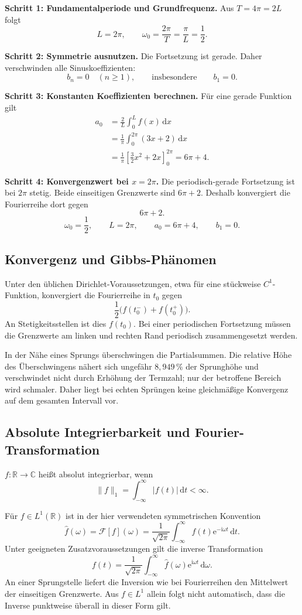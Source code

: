 \documentclass[11pt,a4paper]{article}
\newcommand{\C}{\mathbb C}
\newcommand{\R}{\mathbb R}
\newcommand{\ii}{\mathrm i}
\newcommand{\ee}{\mathrm e}
\newcommand{\dd}{\,\mathrm d}
\newcommand{\1}{\mathbf 1}
\begin{document}
{\begin{beispielbox}[title={Vorgerechnetes Prüfungsbeispiel: Aufgabe 11 (2024) -- Fourierreihe}]
\textbf{Schritt 1: Fundamentalperiode und Grundfrequenz.}
Aus $T=4\pi=2L$ folgt
\[
L=2\pi,
\qquad
\omega_0=\frac{2\pi}{T}=\frac{\pi}{L}=\frac12.
\]

\textbf{Schritt 2: Symmetrie ausnutzen.}
Die Fortsetzung ist gerade. Daher verschwinden alle Sinuskoeffizienten:
\[
b_n=0\quad(n\geq1),
\qquad\text{insbesondere}\qquad b_1=0.
\]

\textbf{Schritt 3: Konstanten Koeffizienten berechnen.}
Für eine gerade Funktion gilt
\[
\begin{aligned}
a_0
&=\frac{2}{L}\int_0^L f(x)\dd x\\
&=\frac1\pi\int_0^{2\pi}(3x+2)\dd x\\
&=\frac1\pi
\left[\frac32x^2+2x\right]_0^{2\pi}
=6\pi+4.
\end{aligned}
\]

\textbf{Schritt 4: Konvergenzwert bei $x=2\pi$.}
Die periodisch-gerade Fortsetzung ist bei $2\pi$ stetig. Beide einseitigen
Grenzwerte sind $6\pi+2$. Deshalb konvergiert die Fourierreihe dort gegen
\[
\boxed{6\pi+2}.
\]
\[
\boxed{
\omega_0=\frac12,\qquad L=2\pi,\qquad
a_0=6\pi+4,\qquad b_1=0.
}
\]
\end{beispielbox}

\subsection{Konvergenz und Gibbs-Phänomen}
Unter den üblichen Dirichlet-Voraussetzungen, etwa für eine stückweise
$C^1$-Funktion, konvergiert die Fourierreihe in $t_0$ gegen
\[
\frac12\bigl(f(t_0^-)+f(t_0^+)\bigr).
\]
An Stetigkeitsstellen ist dies $f(t_0)$. Bei einer periodischen Fortsetzung müssen
die Grenzwerte am linken und rechten Rand periodisch zusammengesetzt werden.

In der Nähe eines Sprungs überschwingen die Partialsummen. Die relative Höhe des
Überschwingens nähert sich ungefähr $8{,}949\,\%$ der Sprunghöhe und verschwindet
nicht durch Erhöhung der Termzahl; nur der betroffene Bereich wird schmaler. Daher
liegt bei echten Sprüngen keine gleichmäßige Konvergenz auf dem gesamten Intervall vor.

\subsection{Absolute Integrierbarkeit und Fourier-Transformation}
$f:\R\to\C$ heißt absolut integrierbar, wenn
\[
\|f\|_1=\int_{-\infty}^{\infty}|f(t)|\dd t<\infty.
\]

Für $f\in L^1(\R)$ ist in der hier verwendeten symmetrischen Konvention
\[
\widehat f(\omega)
=\mathcal F[f](\omega)
=\frac1{\sqrt{2\pi}}\int_{-\infty}^{\infty}
f(t)\ee^{-\ii\omega t}\dd t.
\]
Unter geeigneten Zusatzvoraussetzungen gilt die inverse Transformation
\[
f(t)=\frac1{\sqrt{2\pi}}\int_{-\infty}^{\infty}
\widehat f(\omega)\ee^{\ii\omega t}\dd\omega.
\]
An einer Sprungstelle liefert die Inversion wie bei Fourierreihen den Mittelwert
der einseitigen Grenzwerte. Aus $f\in L^1$ allein folgt nicht automatisch, dass die
Inverse punktweise überall in dieser Form gilt.

}
\end{document}
